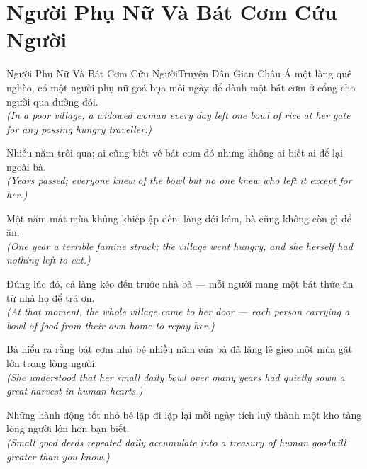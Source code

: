 \section{Người Phụ Nữ Và Bát Cơm Cứu Người}
\begin{truyen}{Người Phụ Nữ Và Bát Cơm Cứu Người}{Truyện Dân Gian Châu Á}
 một làng quê nghèo, có một người phụ nữ goá bụa mỗi ngày để dành một bát cơm ở cổng cho người qua đường đói.\\[4pt]
\textit{(In a poor village, a widowed woman every day left one bowl of rice at her gate for any passing hungry traveller.)}

Nhiều năm trôi qua; ai cũng biết về bát cơm đó nhưng không ai biết ai để lại ngoài bà.\\[4pt]
\textit{(Years passed; everyone knew of the bowl but no one knew who left it except for her.)}

Một năm mất mùa khủng khiếp ập đến; làng đói kém, bà cũng không còn gì để ăn.\\[4pt]
\textit{(One year a terrible famine struck; the village went hungry, and she herself had nothing left to eat.)}

Đúng lúc đó, cả làng kéo đến trước nhà bà --- mỗi người mang một bát thức ăn từ nhà họ để trả ơn.\\[4pt]
\textit{(At that moment, the whole village came to her door --- each person carrying a bowl of food from their own home to repay her.)}

Bà hiểu ra rằng bát cơm nhỏ bé nhiều năm của bà đã lặng lẽ gieo một mùa gặt lớn trong lòng người.\\[4pt]
\textit{(She understood that her small daily bowl over many years had quietly sown a great harvest in human hearts.)}

\end{truyen}
\begin{baihoc}
  Những hành động tốt nhỏ bé lặp đi lặp lại mỗi ngày tích luỹ thành một kho tàng lòng người lớn hơn bạn biết.\\[4pt]
  \textit{(Small good deeds repeated daily accumulate into a treasury of human goodwill greater than you know.)}
\end{baihoc}

